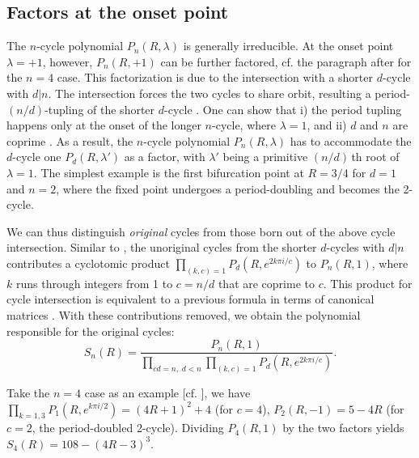 \documentclass{ws-ijbc}
\begin{document}
\subsection{\label{sec:origfac}%
  Factors at the onset point}


The $n$-cycle polynomial $P_n(R, \lambda)$
  is generally irreducible.
At the onset point $\lambda = +1$,
  however, $P_n(R, +1)$ can be further factored,
  cf. the paragraph after  for the $n = 4$ case.
%
This factorization is due to the intersection with
  a shorter $d$-cycle with $d|n$.
%
The intersection forces the two cycles to share orbit,
  resulting a period-$(n/d)$-tupling
  of the shorter $d$-cycle \cite{hao}.
%
One can show that i) the period tupling happens only
  at the onset of the longer $n$-cycle, where $\lambda = 1$,
%
  and ii) $d$ and $n$ are coprime \cite{blackhurst}.
%
As a result, the $n$-cycle polynomial $P_n(R, \lambda)$
  has to accommodate the $d$-cycle one $P_d(R, \lambda')$ as a factor,
  with $\lambda'$ being a primitive $(n/d)\,$th root of $\lambda = 1$.
%
The simplest example is the first bifurcation point
  at $R = 3/4$ for $d = 1$ and $n = 2$,
  where the fixed point %
  undergoes a period-doubling and becomes the 2-cycle. %


We can thus distinguish \emph{original} cycles
  from those born out of the above cycle intersection. %
%
Similar to ,
  the unoriginal cycles
  from the shorter $d$-cycles with $d|n$
  contributes a cyclotomic product
  $\prod_{(k, c) = 1}
      P_{d}
        \left(
          R, e^{2k\pi i/c}
        \right)$ to $P_n(R, 1)$,
where $k$ runs through integers from 1 to $c=n/d$
  that are coprime to $c$.
%
This product for cycle intersection is equivalent to a previous
  formula in terms of canonical matrices \cite{blackhurst}.
%
With these contributions removed,
  we obtain the polynomial responsible for the original cycles:
  \begin{equation}
    S_n(R)
    = \frac
    {
      P_n(R, 1)
    }
    {
      \prod_{c d =  n, \; d < n}
        \prod_{(k, c) = 1}
      P_{d}
        \left(
          R, e^{2k\pi i/c}
        \right)
    }.
  \label{eq:origfac}
  \end{equation}


%
%
%
Take the $n = 4$ case as an example
[cf. ],
we have
$\prod_{k=1,3} P_1(R, e^{k\pi i/2})
=(4R+1)^2+4$
(for $c = 4$),
$P_2(R, -1) = 5 - 4R$
(for $c = 2$, the period-doubled 2-cycle).
%
Dividing $P_4(R, 1)$
by the two factors yields
$S_4(R) = 108-(4R-3)^3$.
\end{document}
